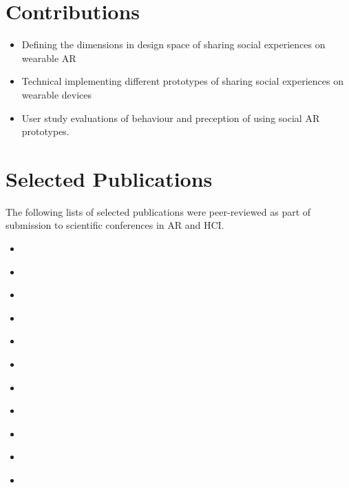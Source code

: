 \section{Contributions}

\begin{itemize}
    \item Defining the dimensions in design space of sharing social experiences on wearable AR
    \item Technical implementing different prototypes of sharing social experiences on wearable devices
    \item User study evaluations of behaviour and preception of using social AR prototypes.
\end{itemize}


\section{Selected Publications}

The following lists of selected publications were peer-reviewed as part of submission to scientific conferences in AR and HCI. 

\begin{itemize}
    \item{ }
    \item{ }
    \item{ }
    \item{ }    
    \item{ }
    \item{ }
    \item{ }
    \item{ }
    \item{ }
    \item{ }
    \item{ }
\end{itemize}